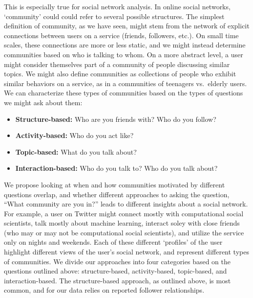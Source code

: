 This is especially true for social network analysis. In online social networks, `community' could could refer to several possible structures. The simplest definition of community, as we have seen, might stem from the network of explicit connections between users on a service (friends, followers, etc.). On small time scales, these connections are more or less static, and we might instead determine communities based on who is talking to whom. On a more abstract level, a user might consider themselves part of a community of people discussing similar topics. We might also define communities as collections of people who exhibit similar behaviors on a service, as in a communities of teenagers vs.\ elderly users. We can characterize these types of communities based on the types of questions we might ask about them:
\begin{itemize}
	\item \textbf{Structure-based:} Who are you friends with? Who do you follow?
	\item \textbf{Activity-based:} Who do you act like?
	\item \textbf{Topic-based:} What do you talk about?
	\item \textbf{Interaction-based:} Who do you talk to? Who do you talk about?
\end{itemize}

We propose looking at when and how communities motivated by different questions overlap, and whether different approaches to asking the question, ``What community are you in?'' leads to different insights about a social network. For example, a user on Twitter might connect mostly with computational social scientists, talk mostly about machine learning, interact soley with close friends (who may or may not be computational social scientists), and utilize the service only on nights and weekends. Each of these different `profiles' of the user highlight different views of the user's social network, and represent different types of communities. We divide our approaches into four categories based on the questions outlined above: structure-based, activity-based, topic-based, and interaction-based. The structure-based approach, as outlined above, is most common, and for our data relies on reported follower relationships.


